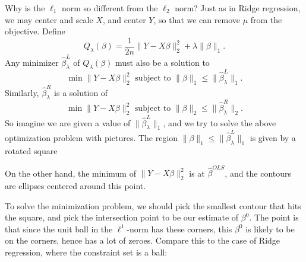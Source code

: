 \documentclass[a4paper]{article}
\begin{document}
Why is the $\ell_1$ norm so different from the $\ell_2$ norm? Just as in Ridge regression, we may center and scale $X$, and center $Y$, so that we can remove $\mu$ from the objective. Define
\[
  Q_\lambda(\beta) = \frac{1}{2n} \|Y - X \beta\|_2^2 + \lambda \|\beta\|_1.
\]
Any minimizer $\hat{\beta}^L_\lambda$ of $Q_\lambda(\beta)$ must also be a solution to
\[
  \min \|Y - X \beta\|_2^2 \text{ subject to } \|\beta\|_1 \leq \|\hat{\beta}_\lambda^L\|_1.
\]
Similarly, $\hat{\beta}_\lambda^R$ is a solution of
\[
  \min \|Y - X \beta\|_2^2 \text{ subject to } \|\beta\|_2 \leq \|\hat{\beta}_\lambda^R\|_2.
\]
So imagine we are given a value of $\|\hat{\beta}_\lambda^L\|_1$, and we try to solve the above optimization problem with pictures. The region $\|\beta\|_1 \leq \|\hat{\beta}_\lambda^L\|_1$ is given by a rotated square
\begin{center}
\end{center}
On the other hand, the minimum of $\|Y - X \beta\|_2^2$ is at $\hat{\beta}^{OLS}$, and the contours are ellipses centered around this point.
\begin{center}
\end{center}
To solve the minimization problem, we should pick the smallest contour that hits the square, and pick the intersection point to be our estimate of $\beta^0$. The point is that since the unit ball in the $\ell^1$-norm has these corners, this $\beta^0$ is likely to be on the corners, hence has a lot of zeroes. Compare this to the case of Ridge regression, where the constraint set is a ball:
\end{document}
